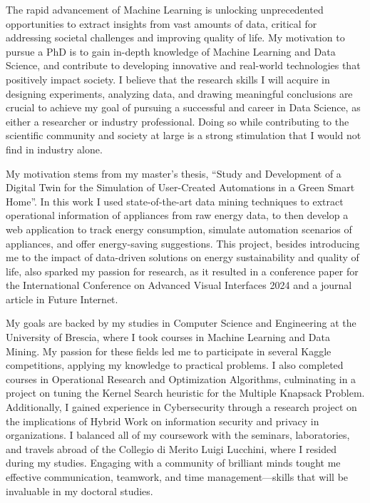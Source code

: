 The rapid advancement of Machine Learning is unlocking unprecedented opportunities to extract insights from vast amounts of data, critical for addressing societal challenges and improving quality of life. My motivation to pursue a PhD is to gain in-depth knowledge of Machine Learning and Data Science, and contribute to developing innovative and real-world technologies that positively impact society. I believe that the research skills I will acquire in designing experiments, analyzing data, and drawing meaningful conclusions are crucial to achieve my goal of pursuing a successful and career in Data Science, as either a researcher or industry professional. Doing so while contributing to the scientific community and society at large is a strong stimulation that I would not find in industry alone.

My motivation stems from my master's thesis, ``Study and Development of a Digital Twin for the Simulation of User-Created Automations in a Green Smart Home''. In this work I used state-of-the-art data mining techniques to extract operational information of appliances from raw energy data, to then develop a web application to track energy consumption, simulate automation scenarios of appliances, and offer energy-saving suggestions. This project, besides introducing me to the impact of data-driven solutions on energy sustainability and quality of life, also sparked my passion for research, as it resulted in a conference paper for the International Conference on Advanced Visual Interfaces 2024 and a journal article in Future Internet.

My goals are backed by my studies in Computer Science and Engineering at the University of Brescia, where I took courses in Machine Learning and Data Mining. My passion for these fields led me to participate in several Kaggle competitions, applying my knowledge to practical problems. I also completed courses in Operational Research and Optimization Algorithms, culminating in a project on tuning the Kernel Search heuristic for the Multiple Knapsack Problem. Additionally, I gained experience in Cybersecurity through a research project on the implications of Hybrid Work on information security and privacy in organizations. I balanced all of my coursework with the seminars, laboratories, and travels abroad of the Collegio di Merito Luigi Lucchini, where I resided during my studies. Engaging with a community of brilliant minds tought me effective communication, teamwork, and time management---skills that will be invaluable in my doctoral studies.


